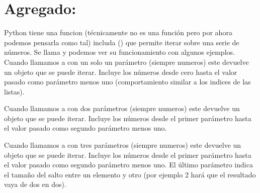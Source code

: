 \documentclass[a4paper,12pt,spanish]{sphinxmanual}
\begin{document}
\section{Agregado: }
\label{\detokenize{for:agregado-range}}
\sphinxAtStartPar
Python tiene una funcion (técnicamente no es una función pero
por ahora podemos pensarla como tal) includa () que
permite iterar sobre una serie de números. Se llama 
y podemos ver su funcionamiento con algunos ejemplos.
Cuando llamamos a  con un solo un parámetro (siempre numeros)
este devuelve un objeto que se puede iterar. Incluye los números
desde cero hasta el valor pasado como parámetro menos uno
(comportamiento similar a los indices de las listas).

\begin{sphinxVerbatim}[commandchars=\\\{\}]
   
\end{sphinxVerbatim}

\sphinxAtStartPar
Cuando llamamos a  con dos parámetros (siempre numeros)
este devuelve un objeto que se puede iterar. Incluye los números
desde el primer parámetro hasta el valor pasado como segundo
parámetro menos uno.

\begin{sphinxVerbatim}[commandchars=\\\{\}]
    
\end{sphinxVerbatim}

\sphinxAtStartPar
Cuando llamamos a  con tres parámetros (siempre numeros)
este devuelve un objeto que se puede iterar. Incluye los números
desde el primer parámetro hasta el valor pasado como segundo
parámetro menos uno. El último parámetro indica el tamaño del
salto entre un elemento y otro (por ejemplo 2 hará que el
resultado vaya de dos en dos).

\begin{sphinxVerbatim}[commandchars=\\\{\}]
     
\end{sphinxVerbatim}
\end{document}
